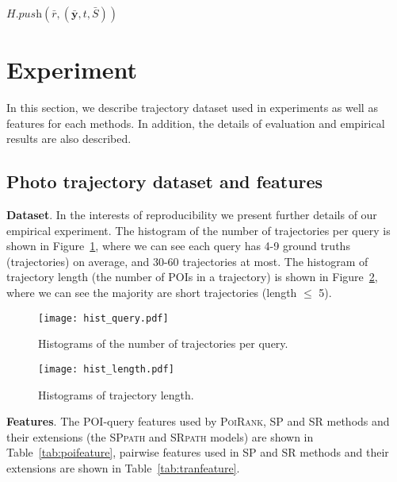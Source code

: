 \begin{algorithm}[htbp]
\begin{algorithmic}[1]
        $H.\textit{push}\left(\bar{r}, (\bar{\mathbf{y}}, t, \bar{S}) \right)$
    \ENDFOR
\ENDWHILE
\end{algorithmic}
\end{algorithm}

\clearpage

\section{Experiment}

In this section, we describe trajectory dataset used in experiments as well as features for each methods.
In addition, the details of evaluation and empirical results are also described.

\subsection{Photo trajectory dataset and features}
\label{sec:feature}

\textbf{Dataset}.
In the interests of reproducibility we present further details of our empirical experiment.
The histogram of the number of trajectories per query is shown in Figure~\ref{fig:hist_query},
where we can see each query has 4-9 ground truths (\ie trajectories) on average, and 30-60 trajectories at most.
The histogram of trajectory length (\ie the number of POIs in a trajectory) is shown in Figure~\ref{fig:hist_length},
where we can see the majority are short trajectories (\ie length $\le$ 5).

\begin{figure}[t]
	\centering
	\texttt{[image: hist\_query.pdf]}
	\caption{Histograms of the number of trajectories per query.}
	\label{fig:hist_query}
\end{figure}


\begin{figure}[t]
	\centering
	\texttt{[image: hist\_length.pdf]}
	\caption{Histograms of trajectory length.}
	\label{fig:hist_length}
\end{figure}


\textbf{Features}.
The POI-query features used by \textsc{PoiRank}, SP and SR methods and their extensions 
(\ie the \textsc{SPpath} and \textsc{SRpath} models) are shown in Table~\ref{tab:poifeature},
pairwise features used in SP and SR methods and their extensions are shown in Table~\ref{tab:tranfeature}.

